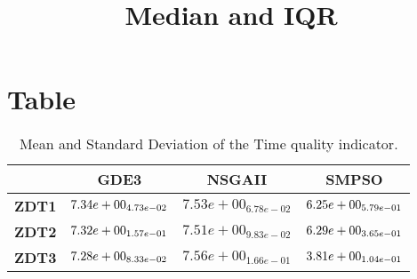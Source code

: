 \documentclass{article}
\title{Median and IQR}
\author{}
\begin{document}
\maketitle
\section{Table}
\begin{table}[!htp]
  \caption{Mean and Standard Deviation of the Time quality indicator.}
  \label{table:Time}
  \centering
  \begin{scriptsize}
  \begin{tabular}{c|ccc}
      & \textbf{GDE3} & \textbf{NSGAII} & \textbf{SMPSO} \\\hline
      \textbf{ZDT1} & $\cellcolor{gray25} 7.34e+00_{4.73e-02} $ & $ 7.53e+00_{6.78e-02} $ & $ \cellcolor{gray95} 6.25e+00_{5.79e-01}$ \\
      \textbf{ZDT2} & $\cellcolor{gray25} 7.32e+00_{1.57e-01} $ & $ 7.51e+00_{9.83e-02} $ & $ \cellcolor{gray95} 6.29e+00_{3.65e-01}$ \\
      \textbf{ZDT3} & $\cellcolor{gray25} 7.28e+00_{8.33e-02} $ & $ 7.56e+00_{1.66e-01} $ & $ \cellcolor{gray95} 3.81e+00_{1.04e-01}$ \\
  \end{tabular}
  \end{scriptsize}
\end{table}
\end{document}
